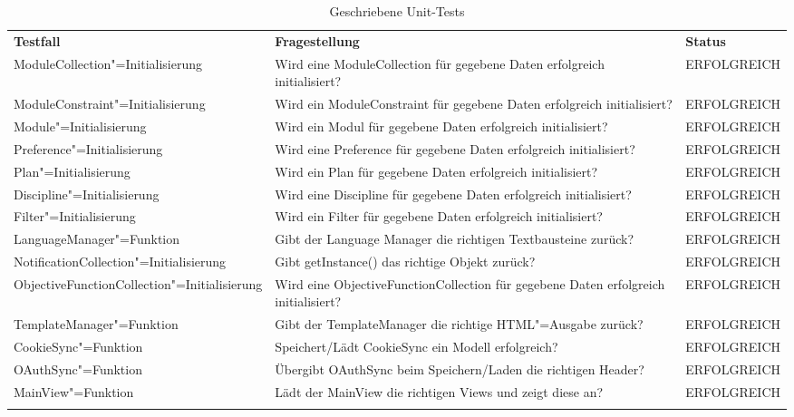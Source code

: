 \begin{longtable}{| >{\hspace{0pt}} p{} | >{\hspace{0pt}} p{} | >{\hspace{0pt}} p{} |}
	\hline
	\textbf{Testfall} & \textbf{Fragestellung} & \textbf{Status} \\ 
	\hhline{|=|=|=|}  
	\endfirsthead
	\endhead
	
	ModuleCollection"=Initialisierung & Wird eine ModuleCollection für gegebene Daten erfolgreich initialisiert?  & ERFOLGREICH \\ \hline
	ModuleConstraint"=Initialisierung & Wird ein ModuleConstraint für gegebene Daten erfolgreich initialisiert? & ERFOLGREICH \\ \hline
	Module"=Initialisierung & Wird ein Modul für gegebene Daten erfolgreich initialisiert? & ERFOLGREICH \\ \hline
	Preference"=Initialisierung & Wird eine Preference für gegebene Daten erfolgreich initialisiert? & ERFOLGREICH \\ \hline
	Plan"=Initialisierung & Wird ein Plan für gegebene Daten erfolgreich initialisiert? & ERFOLGREICH \\ \hline
	Discipline"=Initialisierung & Wird eine Discipline für gegebene Daten erfolgreich initialisiert? & ERFOLGREICH \\ \hline
	Filter"=Initialisierung & Wird ein Filter für gegebene Daten erfolgreich initialisiert? & ERFOLGREICH \\ \hline
	LanguageManager"=Funktion & Gibt der Language Manager die richtigen Textbausteine zurück? & ERFOLGREICH \\ \hline
	NotificationCollection"=Initialisierung & Gibt getInstance() das richtige Objekt zurück? & ERFOLGREICH \\ \hline
	ObjectiveFunctionCollection"=Initialisierung & Wird eine ObjectiveFunctionCollection für gegebene Daten erfolgreich initialisiert? & ERFOLGREICH \\ \hline
	TemplateManager"=Funktion & Gibt der TemplateManager die richtige HTML"=Ausgabe zurück? & ERFOLGREICH \\ \hline
	CookieSync"=Funktion & Speichert/Lädt CookieSync ein Modell erfolgreich? & ERFOLGREICH \\ \hline
	OAuthSync"=Funktion & Übergibt OAuthSync beim Speichern/Laden die richtigen Header? & ERFOLGREICH \\ \hline
	MainView"=Funktion & Lädt der MainView die richtigen Views und zeigt diese an? & ERFOLGREICH \\	 
	\hhline{|=|=|=|}   
	\caption{Geschriebene Unit-Tests}
\end{longtable}